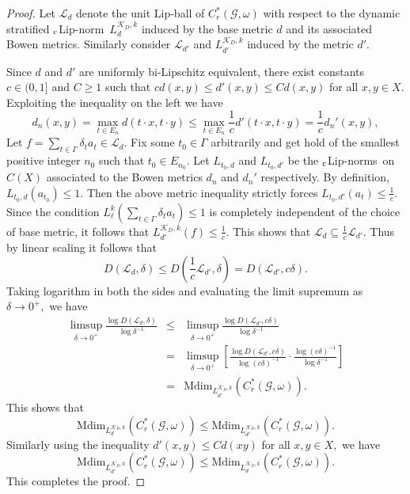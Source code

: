 \documentclass[a4paper,11pt,reqno]{amsart}
\theoremstyle{plain}
\theoremstyle{mainthmstyle}
\theoremstyle{named}
\numberwithin{equation}{section}
\newcommand{\Bea}{\begin{eqnarray*}}
\newcommand{\Eea}{\end{eqnarray*}}
\newcommand{\clipnorm}{$_{\text{\rm c}}$Lip-norm}
\newcommand{\clipnorms}{$_{\text{\rm c}}$Lip-norms}
\begin{document}
\begin{proof}
Let $\mathcal{L}_d$ denote the unit Lip-ball of $C_r^*(\mathcal{G}, \omega)$ with respect to the dynamic stratified \clipnorm\ $L_d^{\mathcal K_D, k}$ induced by the base metric $d$ and its associated Bowen metrics. Similarly consider $\mathcal L_{d'}$ and $L^{\mathcal K_D, k}_{d'}$ induced by the metric $d'.$

\vspace{2mm}

Since $d$ and $d'$ are uniformly bi-Lipschitz equivalent, there exist constants $c \in (0, 1]$ and $C \geq 1$ such that $c d(x, y) \leq d'(x, y) \leq C d (x,y)$ for all $x, y \in X.$ Exploiting the inequality on the left we have
$$d_n(x, y) = \max_{t \in E_n} d(t \cdot x, t \cdot y) \le \max_{t \in E_n} \frac{1}{c} d'(t \cdot x, t \cdot y) = \frac{1}{c} d_n'(x, y),$$ 
Let $f = \sum\limits_{t \in \Gamma} \delta_t a_t \in \mathcal{L}_d.$ Fix some $t_0 \in \Gamma$ arbitrarily and get hold of the smallest positive integer $n_0$ such that $t_0 \in E_{n_0}.$ Let $L_{t_0, d}$ and $L_{t_0, d'}$ be the \clipnorms\ on $C (X)$ associated to the Bowen metrics $d_n$ and $d_n'$ respectively. By definition, $L_{t_0, d} (a_{t_0}) \leq 1.$ Then the above metric inequality strictly forces $L_{t_0, d'}(a_t) \leq \frac{1}{c}.$ Since the condition $L_{\ell}^k \left (\sum\limits_{t \in \Gamma} \delta_t a_t \right ) \leq 1$ is completely independent of the choice of base metric, it follows that $L_{d'}^{\mathcal K_D, k}(f) \le \frac{1}{c}.$ 
This shows that $\mathcal{L}_d \subseteq \frac{1}{c} \mathcal{L}_{d'}.$ Thus by linear scaling it follows that
$$D(\mathcal{L}_d, \delta) \le D\left(\frac{1}{c} \mathcal{L}_{d'}, \delta\right) = D(\mathcal{L}_{d'}, c\delta).$$
Taking logarithm in both the sides and evaluating the limit supremum as $\delta \to 0^+,$ we have
\Bea
\limsup_{\delta \to 0^+} \frac{\log D(\mathcal{L}_d, \delta)}{\log \delta^{-1}} & \leq & \limsup_{\delta \to 0^+} \frac{\log D(\mathcal{L}_{d'}, c\delta)}{\log \delta^{-1}} \\
& = & \limsup_{\delta \to 0^+} \left[ \frac{\log D(\mathcal{L}_{d'}, c\delta)}{\log(c\delta)^{-1}} \cdot \frac{\log(c\delta)^{-1}}{\log \delta^{-1}} \right] \\
& = & \mathrm{Mdim}_{L_{d'}^{\mathcal K_D, k}} (C_r^*(\mathcal{G}, \omega)).
\Eea
This shows that 
$$\mathrm{Mdim}_{L_d^{\mathcal K_D,k}} (C_r^*(\mathcal{G}, \omega)) \leq \mathrm{Mdim}_{L_{d'}^{\mathcal K_D, k}} \left (C_r^{\ast} (\mathcal G, \omega) \right ).$$ Similarly using the inequality $d' (x, y) \leq C d (x y)$ for all $x, y \in X,$ we have
$$\mathrm{Mdim}_{L_{d'}^{\mathcal K_D, k}} \left (C_r^{\ast} (\mathcal G, \omega) \right ) \leq \mathrm{Mdim}_{L_d^{\mathcal K_D,k}} (C_r^{\ast}(\mathcal{G}, \omega)).$$
This completes the proof.

\end{proof}
\end{document}
